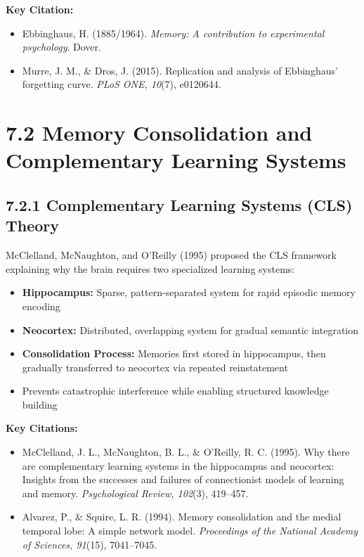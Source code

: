 \documentclass[11pt,letterpaper]{article}
\begin{document}
\textbf{Key Citation:}
\begin{itemize}[leftmargin=*]
    \item Ebbinghaus, H. (1885/1964). \textit{Memory: A contribution to experimental psychology}. Dover.
    \item Murre, J. M., \& Dros, J. (2015). Replication and analysis of Ebbinghaus' forgetting curve. \textit{PLoS ONE, 10}(7), e0120644.
\end{itemize}

\section{\color{garnet}7.2 Memory Consolidation and Complementary Learning Systems}

\subsection{7.2.1 Complementary Learning Systems (CLS) Theory}

McClelland, McNaughton, and O'Reilly (1995) proposed the CLS framework explaining why the brain requires two specialized learning systems:

\begin{itemize}[leftmargin=*]
    \item \textbf{Hippocampus:} Sparse, pattern-separated system for rapid episodic memory encoding
    \item \textbf{Neocortex:} Distributed, overlapping system for gradual semantic integration
    \item \textbf{Consolidation Process:} Memories first stored in hippocampus, then gradually transferred to neocortex via repeated reinstatement
    \item Prevents catastrophic interference while enabling structured knowledge building
\end{itemize}

\textbf{Key Citations:}
\begin{itemize}[leftmargin=*]
    \item McClelland, J. L., McNaughton, B. L., \& O'Reilly, R. C. (1995). Why there are complementary learning systems in the hippocampus and neocortex: Insights from the successes and failures of connectionist models of learning and memory. \textit{Psychological Review, 102}(3), 419--457.
    \item Alvarez, P., \& Squire, L. R. (1994). Memory consolidation and the medial temporal lobe: A simple network model. \textit{Proceedings of the National Academy of Sciences, 91}(15), 7041--7045.
\end{itemize}
\end{document}
